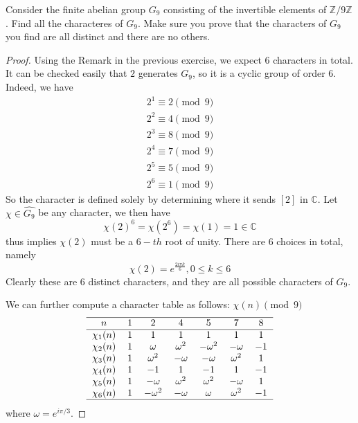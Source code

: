 \documentclass[11pt,letterpaper]{article}
\DeclareMathOperator{\1}{\mathbbm{1}}
\begin{document}
\begin{exercise}
  \label{ex3}
  Consider the finite abelian group $G_9$ consisting of the invertible elements of $\mathbb{Z}/9\mathbb{Z}$. Find all the characteres of $G_9$.
  Make sure you prove that the characters of $G_9$ you find are all distinct and there are no others.
\end{exercise}
\begin{proof}
  Using the Remark in the previous exercise, we expect $6$ characters in total. It can be checked easily that $2$ generates $G_9$, so it is a
  cyclic group of order $6$. Indeed, we have
  \begin{align*}
    2^1 \equiv 2 \pmod 9 \\
    2^2 \equiv 4 \pmod 9 \\
    2^3 \equiv 8 \pmod 9 \\
    2^4 \equiv 7 \pmod 9 \\
    2^5 \equiv 5 \pmod 9 \\
    2^6 \equiv 1 \pmod 9
  \end{align*}
  So the character is defined solely by determining where it sends $[2]$ in $\mathbb{C}$. Let $\chi \in \hat{G_9}$ be
  any character, we then have
  \[\chi(2)^6=\chi(2^6) = \chi(1) = 1 \in \mathbb{C}\]
  thus implies $\chi(2)$ must be a $6-th$ root of unity. There are $6$ choices in total, namely
  \[\chi(2) = e^{\frac{2i\pi k}{6}}, 0 \le k \le 6\]
  Clearly these are 6 distinct characters, and they are all possible characters of $G_9$.

  We can further compute a character table as follows:
  $\chi(n)\pmod{9}$ \\
  \[\begin{tabular}{c c c c c c c }
      \hline
      $n$         & $1$ & $2$           & $4$          & $5$           & $7$          & $8$  \\
      \hline
      $\chi_1(n)$ & $1$ & $1$           & $1$          & $1$           & $1$          & $1$  \\
      $\chi_2(n)$ & $1$ & $\omega$      & $\omega^{2}$ & $-\omega^{2}$ & $-\omega$    & $-1$ \\
      $\chi_3(n)$ & $1$ & $\omega^{2}$  & $-\omega$    & $-\omega$     & $\omega^{2}$ & $1$  \\
      $\chi_4(n)$ & $1$ & $-1$          & $1$          & $-1$          & $1$          & $-1$ \\
      $\chi_5(n)$ & $1$ & $-\omega$     & $\omega^{2}$ & $\omega^{2}$  & $-\omega$    & $1$  \\
      $\chi_6(n)$ & $1$ & $-\omega^{2}$ & $-\omega$    & $\omega$      & $\omega^{2}$ & $-1$ \\
      \hline
    \end{tabular}\]
  where  $\omega = e^{i\pi/3}$.
\end{proof}
\end{document}
